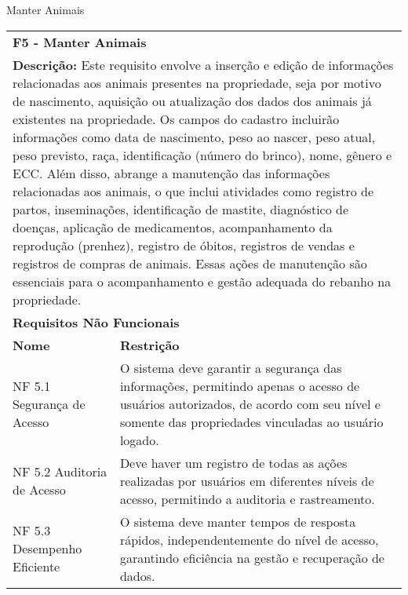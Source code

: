 \begin{tabframed}[htb]
  \caption{Manter Animais}
  \label{quad:requisitoManterAnimais}
  \renewcommand{\arraystretch}{1.5}
  \begin{tabular}{|l|l|}
    \cline{1-2}
    \multicolumn{2}{|l|}{\textbf{F5 - Manter Animais}}
    \\ \cline{1-2}

    \multicolumn{2}{|p{15cm}|}{
    \raggedright \textbf{Descrição:} Este requisito envolve a inserção e edição de informações relacionadas aos animais presentes na propriedade, seja por motivo de nascimento, aquisição ou atualização dos dados dos animais já existentes na propriedade. Os campos do cadastro incluirão informações como data de nascimento, peso ao nascer, peso atual, peso previsto, raça, identificação (número do brinco), nome, gênero e \gls{ECC}.
    Além disso, abrange a manutenção das informações relacionadas aos animais, o que inclui atividades como registro de partos, inseminações, identificação de mastite, diagnóstico de doenças, aplicação de medicamentos, acompanhamento da reprodução (prenhez), registro de óbitos, registros de vendas e registros de compras de animais. Essas ações de manutenção são essenciais para o acompanhamento e gestão adequada do rebanho na propriedade.
    }
    \\ \cline{1-2}

    \multicolumn{2}{|l|}{\textbf{Requisitos Não Funcionais}}
    \\ \cline{1-2}

    \textbf{Nome}                             &
    \textbf{Restrição}
    \\ \cline{1-2}

    NF 5.1 Segurança de Acesso                &
    \multicolumn{1}{|p{8cm}|}{\raggedright O sistema deve garantir a segurança das informações, permitindo apenas o acesso de usuários autorizados, de acordo com seu nível e somente das propriedades vinculadas ao usuário logado.}
    \\ \cline{1-2}

    NF 5.2 Auditoria de Acesso                &
    \multicolumn{1}{|p{8cm}|}{\raggedright Deve haver um registro de todas as ações realizadas por usuários em diferentes níveis de acesso, permitindo a auditoria e rastreamento.}
    \\ \cline{1-2}

    NF 5.3 Desempenho Eficiente               &
    \multicolumn{1}{|p{8cm}|}{\raggedright O sistema deve manter tempos de resposta rápidos, independentemente do nível de acesso, garantindo eficiência na gestão e recuperação de dados.}
    \\ \cline{1-2}


\end{tabular}
\end{tabframed}
